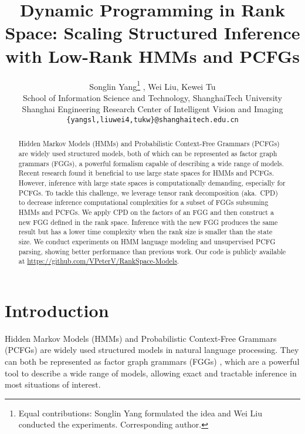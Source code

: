 \documentclass[11pt]{article}
\title{Dynamic Programming in Rank Space: Scaling Structured Inference with Low-Rank HMMs and PCFGs}
\author{Songlin Yang\thanks{\; Equal contributions: Songlin Yang formulated the idea and Wei Liu conducted the experiments.   Corresponding author.} , Wei Liu\printfnsymbol{1}, Kewei Tu\\
  School of Information Science and Technology, ShanghaiTech University \\
    Shanghai Engineering Research Center of Intelligent Vision and Imaging\\ 
    {\tt \{yangsl,liuwei4,tukw\}@shanghaitech.edu.cn}\\
 }
\begin{document}
\maketitle
\begin{abstract}
Hidden Markov Models (HMMs) and Probabilistic Context-Free Grammars (PCFGs) are widely used structured models, both of which can be represented as factor graph grammars (FGGs), a powerful formalism capable of describing a wide range of models. Recent research found it beneficial to use large state spaces for HMMs and PCFGs. However, inference with large state spaces is computationally demanding, especially for PCFGs. To tackle this challenge, we leverage tensor rank decomposition (aka.\ CPD) to decrease inference computational complexities for a subset of FGGs subsuming HMMs and PCFGs. We apply CPD on the factors of an FGG and then construct a new FGG defined in the rank space. Inference with the new FGG produces the same result but has a lower time complexity when the rank size is smaller than the state size. We conduct experiments on HMM language modeling and unsupervised PCFG parsing, showing better performance than previous work. Our code is publicly available at \url{https://github.com/VPeterV/RankSpace-Models}.



\end{abstract}

\section{Introduction}
Hidden Markov Models (HMMs) and Probabilistic Context-Free Grammars (PCFGs) are widely used structured models in natural language processing. They can both be represented as factor graph grammars (FGGs) \cite{DBLP:conf/nips/0001R20}, which are a powerful tool to describe a wide range of models, allowing exact and tractable inference in most situations of interest.
\end{document}
